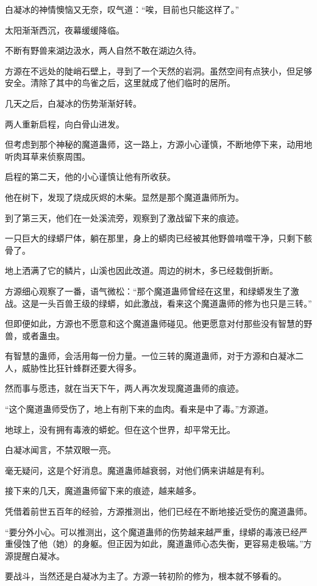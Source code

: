 \begin{this_body}
白凝冰的神情懊恼又无奈，叹气道：“唉，目前也只能这样了。”

太阳渐渐西沉，夜幕缓缓降临。

不断有野兽来湖边汲水，两人自然不敢在湖边久待。

方源在不远处的陡峭石壁上，寻到了一个天然的岩洞。虽然空间有点狭小，但足够安全。清除了其中的鸟雀之后，这里就成了他们临时的居所。

几天之后，白凝冰的伤势渐渐好转。

两人重新启程，向白骨山进发。

但考虑到那个神秘的魔道蛊师，这一路上，方源小心谨慎，不断地停下来，动用地听肉耳草来侦察周围。

启程的第二天，他的小心谨慎让他有所收获。

他在树下，发现了烧成灰烬的木柴。显然是那个魔道蛊师所为。

到了第三天，他们在一处溪流旁，观察到了激战留下来的痕迹。

一只巨大的绿蟒尸体，躺在那里，身上的蟒肉已经被其他野兽啃噬干净，只剩下骸骨了。

地上洒满了它的鳞片，山溪也因此改道。周边的树木，多已经栽倒折断。

方源细心观察了一番，语气微松：“那个魔道蛊师曾经在这里，和绿蟒发生了激战。这是一头百兽王级的绿蟒，如此激战，看来这个魔道蛊师的修为也只是三转。”

但即便如此，方源也不愿意和这个魔道蛊师碰见。他更愿意对付那些没有智慧的野兽，或者蛊虫。

有智慧的蛊师，会活用每一份力量。一位三转的魔道蛊师，对于方源和白凝冰二人，威胁性比狂针蜂群还要大得多。

然而事与愿违，就在当天下午，两人再次发现魔道蛊师的痕迹。

“这个魔道蛊师受伤了，地上有削下来的血肉。看来是中了毒。”方源道。

地球上，没有拥有毒液的蟒蛇。但在这个世界，却平常无比。

白凝冰闻言，不禁双眼一亮。

毫无疑问，这是个好消息。魔道蛊师越衰弱，对他们俩来讲越是有利。

接下来的几天，魔道蛊师留下来的痕迹，越来越多。

凭借着前世五百年的经验，方源推测出，他们已经在不断地接近受伤的魔道蛊师。

“要分外小心。可以推测出，这个魔道蛊师的伤势越来越严重，绿蟒的毒液已经严重侵蚀了他（她）的身躯。但正因为如此，魔道蛊师心态失衡，更容易走极端。”方源提醒白凝冰。

要战斗，当然还是白凝冰为主了。方源一转初阶的修为，根本就不够看的。


\end{this_body}
